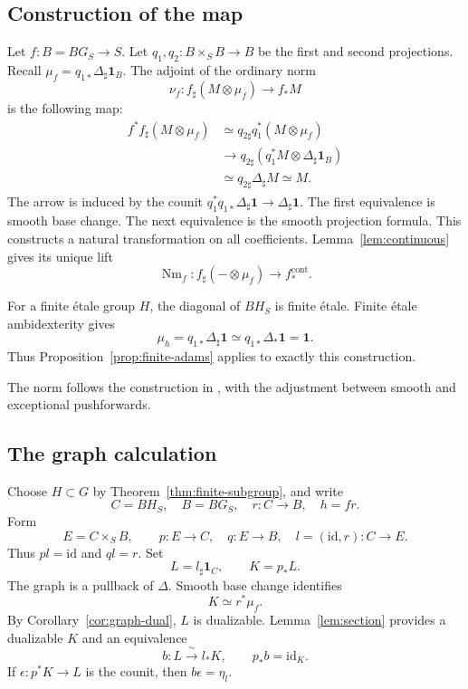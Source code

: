 \documentclass[11pt,reqno]{amsart}
\theoremstyle{definition}
\theoremstyle{remark}
\theoremstyle{plain}
\numberwithin{equation}{section}
\newcommand{\one}{\mathbf 1}
\newcommand{\Nm}{\operatorname{Nm}}
\newcommand{\cont}{\mathrm{cont}}
\begin{document}
\subsection{Construction of the map}
Let \(f:B=BG_S\to S\).
Let \(q_1,q_2:B\times_S B\to B\) be the first and second projections.
Recall \(\mu_f=q_{1*}\Delta_\sharp\one_B\).
The adjoint of the ordinary norm
\[
 \nu_f:f_\sharp(M\otimes\mu_f)\longrightarrow f_*M
\]
is the following map:
\begin{equation}\label{eq:norm-adjoint}
\begin{split}
 f^*f_\sharp(M\otimes\mu_f)
 &\simeq q_{2\sharp}q_1^*(M\otimes\mu_f)\\
 &\longrightarrow q_{2\sharp}
       (q_1^*M\otimes\Delta_\sharp\one_B)\\
 &\simeq q_{2\sharp}\Delta_\sharp M
 \simeq M.
\end{split}
\end{equation}
The arrow is induced by the counit
\(q_1^*q_{1*}\Delta_\sharp\one\to\Delta_\sharp\one\).
The first equivalence is smooth base change.
The next equivalence is the smooth projection formula.
This constructs a natural transformation on all coefficients.
Lemma~\ref{lem:continuous} gives its unique lift
\[
 \Nm_f:f_\sharp(-\otimes\mu_f)\longrightarrow f_*^{\cont}.
\]

For a finite étale group \(H\), the diagonal of \(BH_S\) is finite étale.
Finite étale ambidexterity gives
\[
 \mu_h=q_{1*}\Delta_\sharp\one
 \simeq q_{1*}\Delta_*\one
 =\one.
\]
Thus Proposition~\ref{prop:finite-adams} applies to exactly this construction.

The norm follows the construction in
\cite[Notation~1.3.1 and Construction~1.3.5]{RaksitTate},
with the adjustment between smooth and exceptional pushforwards.

\subsection{The graph calculation}
Choose \(H\subset G\) by Theorem~\ref{thm:finite-subgroup}, and write
\[
 C=BH_S,\quad B=BG_S,\quad r:C\to B,\quad h=fr.
\]
Form
\begin{equation}\label{eq:graph-diagram}
 E=C\times_S B,\qquad
 p:E\to C,\quad q:E\to B,\quad
 l=(\mathrm{id},r):C\to E.
\end{equation}
Thus \(pl=\mathrm{id}\) and \(ql=r\).
Set
\[
 L=l_\sharp\one_C,\qquad K=p_*L.
\]
The graph is a pullback of \(\Delta\).
Smooth base change identifies
\begin{equation}\label{eq:K-mu}
 K\simeq r^*\mu_f.
\end{equation}
By Corollary~\ref{cor:graph-dual}, \(L\) is dualizable.
Lemma~\ref{lem:section} provides a dualizable \(K\) and an equivalence
\[
 b:L\xrightarrow{\ \sim\ }l_*K,\qquad p_*b=\mathrm{id}_K.
\]
If \(\epsilon:p^*K\to L\) is the counit, then \(b\epsilon=\eta_l\).
\end{document}

